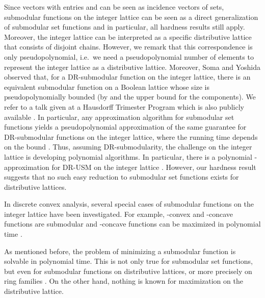 \documentclass{article}
\theoremstyle{plain}
\theoremstyle{definition}
\begin{document}
Since vectors with entries  and  can be seen as incidence vectors of sets, 
submodular functions on the integer lattice can be seen as a direct generalization of submodular set functions and in particular, all hardness results still apply. 
Moreover, the integer lattice can be interpreted as a specific distributive lattice that consists of disjoint chains. 
However, we remark that this correspondence is only pseudopolynomial, i.e.\ we need a pseudopolynomial number of 
elements to represent the integer lattice as a distributive lattice.  
Moreover, Soma and Yoshida observed that, for a DR-submodular function on the integer lattice, 
there is an equivalent submodular function on a Boolean lattice whose size is pseudopolynomially bounded (by  and the upper bound for the components).
We refer to a talk given at a Hausdorff Trimester Program which is also publicly available \cite{SomaBonnTalk}.
In particular, any approximation algorithm for submodular set functions yields a pseudopolynomial approximation 
of the same guarantee for DR-submodular functions on the integer lattice, where the running time depends on the bound . 
Thus, assuming DR-submodularity, the challenge on the integer lattice is developing polynomial algorithms.
In particular, there is a polynomial -approximation for DR-USM on the integer lattice \cite{SomaDR-SMBIL}. 
However, our hardness result suggests that no such easy reduction to submodular set functions exists for distributive lattices. 

In discrete convex analysis, several special cases of submodular functions on the integer lattice have been investigated. 
For example, -convex and -concave functions are submodular 
and -concave functions can be maximized in polynomial time \cite{Murota}.


As mentioned before, the problem of minimizing a submodular function is solvable in polynomial time. 
This is not only true for submodular set functions, but even for submodular functions on distributive lattices, 
or more precisely on ring families \cite{FujiDistrLattice}. On the other hand, nothing is known for maximization 
on the distributive lattice. 
\end{document}
